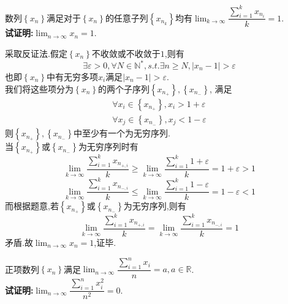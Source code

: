 \documentclass{ctexart}
\begin{document}
\begin{problem}[2.]
    数列$\left\{ x_n\right\}$满足对于$\left\{ x_n\right\}$的任意子列$\left\{ x_{n_k}\right\}$均有$\displaystyle\lim_{k\to\infty}{\dfrac{\sum_{i=1}^{k}{x_{n_i}}}{k}}=1$.\\
    \textbf{试证明:}$\displaystyle\lim_{n\to\infty}{x_n}=1$.
\end{problem}
\begin{solution}[Proof.]
    采取反证法.假定$\left\{ x_n\right\}$不收敛或不收敛于$1$,则有
    $$\exists\varepsilon>0,\forall N\in\mathbb{N}^*,s.t.\exists n\geqslant N,\left\lvert x_n-1\right\rvert>\varepsilon$$
    也即$\left\{ x_n\right\}$中有无穷多项$x_i$满足$\left\lvert x_n-1\right\rvert>\varepsilon$.\\
    我们将这些项分为$\left\{ x_n\right\}$的两个子序列$\left\{ x_{n_+}\right\},\left\{ x_{n_-}\right\}$,
    满足$$\begin{aligned}
    \forall x_i\in\left\{ x_{n_+}\right\},x_i>1+\varepsilon \\
    \forall x_j\in\left\{ x_{n_-}\right\},x_j<1-\varepsilon
    \end{aligned}$$
    则$\left\{ x_{n_+}\right\},\left\{ x_{n_-}\right\}$中至少有一个为无穷序列.\\
    当$\left\{ x_{n_+}\right\}$或$\left\{ x_{n_-}\right\}$为无穷序列时有
    $$\lim_{k\to\infty}{\dfrac{\sum_{i=1}^{k}{x_{n_{+,i}}}}{k}}\geqslant \lim_{k\to\infty}{\dfrac{\sum_{i=1}^{k}{1+\varepsilon}}{k}}=1+\varepsilon>1$$
    $$\lim_{k\to\infty}{\dfrac{\sum_{i=1}^{k}{x_{n_{-,i}}}}{k}}\leqslant \lim_{k\to\infty}{\dfrac{\sum_{i=1}^{k}{1-\varepsilon}}{k}}=1-\varepsilon<1$$
    而根据题意,若$\left\{ x_{n_+}\right\}$或$\left\{ x_{n_-}\right\}$为无穷序列,则有
    $$\lim_{k\to\infty}{\dfrac{\sum_{i=1}^{k}{x_{n_{+,i}}}}{k}}=\lim_{k\to\infty}{\dfrac{\sum_{i=1}^{k}{x_{n_{-,i}}}}{k}=1}$$
    矛盾.故$\displaystyle\lim_{n\to\infty}{x_n}=1$,证毕.
\end{solution}
\begin{problem}[3.]
    正项数列$\left\{ x_n\right\}$满足$\displaystyle\lim_{n\to\infty}{\dfrac{\sum_{i=1}^{n}{x_i}}{n}}=a,a\in\mathbb{R}$.\\
    \textbf{试证明:}$\displaystyle\lim_{n\to\infty}{\dfrac{\sum_{i=1}^{n}{x_i^2}}{n^2}}=0$.
\end{problem}
\end{document}

